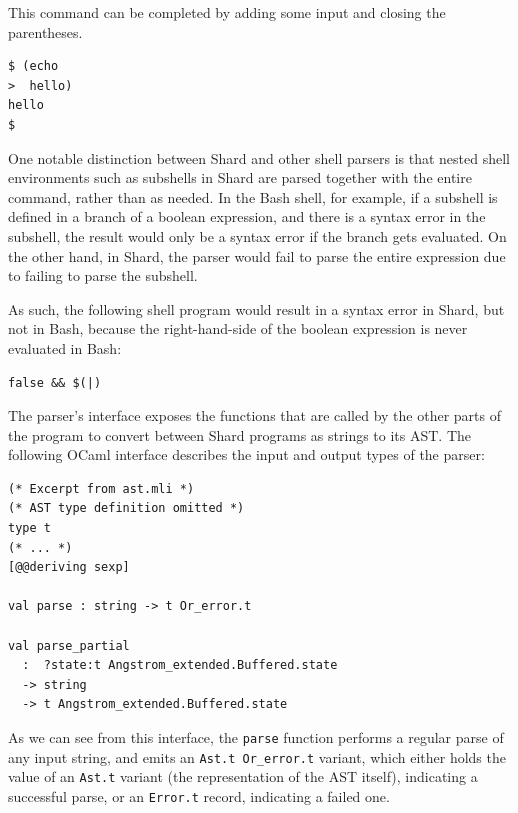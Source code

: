 \documentclass[twoside]{report}
\begin{document}
This command can be completed by adding some input and closing the parentheses.

\begin{minipage}[c]{\textwidth-15pt}
  \begin{lstlisting}[language=shard]
$ (echo
>  hello)
hello
$
\end{lstlisting}
  \smallskip
\end{minipage}

One notable distinction between Shard and other shell parsers is that nested shell environments such as subshells in Shard are parsed together with the entire command, rather than as needed.
In the Bash shell, for example, if a subshell is defined in a branch of a boolean expression, and there is a syntax error in the subshell, the result would only be a syntax error if the branch gets evaluated.
On the other hand, in Shard, the parser would fail to parse the entire expression due to failing to parse the subshell.

As such, the following shell program would result in a syntax error in Shard, but not in Bash, because the right-hand-side of the boolean expression is never evaluated in Bash:

\begin{minipage}[c]{\textwidth-15pt}
  \begin{lstlisting}[language=shard]
false && $(|)
\end{lstlisting}
  \smallskip
\end{minipage}

The parser's interface exposes the functions that are called by the other parts of the program to convert between Shard programs as strings to its AST. The following OCaml interface describes the input and output types of the parser:

\begin{minipage}[c]{\textwidth-15pt}
  \begin{lstlisting}
(* Excerpt from ast.mli *)
(* AST type definition omitted *)
type t
(* ... *)
[@@deriving sexp]

val parse : string -> t Or_error.t

val parse_partial
  :  ?state:t Angstrom_extended.Buffered.state
  -> string
  -> t Angstrom_extended.Buffered.state
\end{lstlisting}
  \smallskip
\end{minipage}

As we can see from this interface, the \texttt{parse} function performs a regular parse of any input string, and emits an \texttt{Ast.t Or\_error.t} variant, which either holds the value of an \texttt{Ast.t} variant (the representation of the AST itself), indicating a successful parse, or an \texttt{Error.t} record, indicating a failed one.
\end{document}
